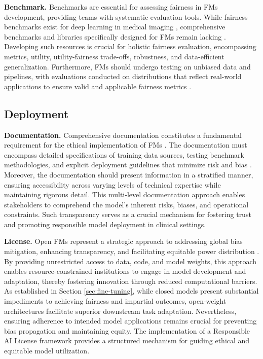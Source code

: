 \textbf{Benchmark.} Benchmarks are essential for assessing fairness in FMs development, providing teams with systematic evaluation tools. While fairness benchmarks exist for deep learning in medical imaging \cite{zong_medfair_2023, zhang_improving_2022, zhou_radfusion_2021, dutt_fairtune_2024}, comprehensive benchmarks and libraries specifically designed for FMs remain lacking \cite{jin_fairmedfm_2024, khan_how_2023}. Developing such resources is crucial for holistic fairness evaluation, encompassing metrics, utility, utility-fairness trade-offs, robustness, and data-efficient generalization. Furthermore, FMs should undergo testing on unbiased data and pipelines, with evaluations conducted on distributions that reflect real-world applications to ensure valid and applicable fairness metrics \cite{longpre_responsible_2024}.

\subsection{Deployment}
\textbf{Documentation.} Comprehensive documentation constitutes a fundamental requirement for the ethical implementation of FMs \cite{longpre_responsible_2024, bommasani_foundation_2023}. The documentation must encompass detailed specifications of training data sources, testing benchmark methodologies, and explicit deployment guidelines that minimize risk and bias \cite{mitchell_model_2019}. Moreover, the documentation should present information in a stratified manner, ensuring accessibility across varying levels of technical expertise while maintaining rigorous detail. This multi-level documentation approach enables stakeholders to comprehend the model's inherent risks, biases, and operational constraints. Such transparency serves as a crucial mechanism for fostering trust and promoting responsible model deployment in clinical settings.

\textbf{License.} Open FMs represent a strategic approach to addressing global bias mitigation, enhancing transparency, and facilitating equitable power distribution \cite{bommasani_considerations_2024, matheny_artificial_2025}. By providing unrestricted access to data, code, and model weights, this approach enables resource-constrained institutions to engage in model development and adaptation, thereby fostering innovation through reduced computational barriers. As established in Section \ref{sec:fine-tuning}, while closed models present substantial impediments to achieving fairness and impartial outcomes, open-weight architectures facilitate superior downstream task adaptation. Nevertheless, ensuring adherence to intended model applications remains crucial for preventing bias propagation and maintaining equity. The implementation of a Responsible AI License framework provides a structured mechanism for guiding ethical and equitable model utilization.

